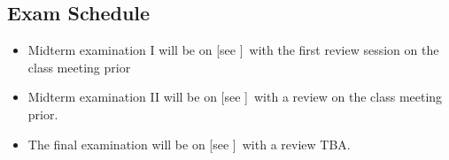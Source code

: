 
\subsection*{Exam Schedule}\label{subsec:exam_schedule}

\begin{itemize}
\itemsep -0.0em 
\item Midterm examination I will be on [see \coursewebpagelink]~with the first review session on the class meeting prior
\item Midterm examination II will be on [see \coursewebpagelink]~with a review on the class meeting prior.
\item The final examination will be on [see \coursewebpagelink]~with a review TBA.
\end{itemize}